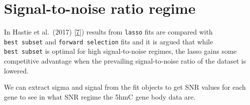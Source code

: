 \documentclass[
]{book}
\newenvironment{Shaded}{\begin{snugshade}}{\end{snugshade}}
\newcommand{\DecValTok}[1]{\textcolor[rgb]{0.00,0.00,0.81}{#1}}
\newcommand{\FloatTok}[1]{\textcolor[rgb]{0.00,0.00,0.81}{#1}}
\newcommand{\KeywordTok}[1]{\textcolor[rgb]{0.13,0.29,0.53}{\textbf{#1}}}
\newcommand{\NormalTok}[1]{#1}
\newcommand{\OperatorTok}[1]{\textcolor[rgb]{0.81,0.36,0.00}{\textbf{#1}}}
\newcommand{\StringTok}[1]{\textcolor[rgb]{0.31,0.60,0.02}{#1}}
\begin{document}
\hypertarget{snr-regime}{%
\section{Signal-to-noise ratio regime}\label{snr-regime}}

In Hastie et al.~(2017) {[}\protect\hyperlink{ref-Hastie:2017aa}{7}{]}) results from \texttt{lasso} fits are
compared with \texttt{best\ subset} and \texttt{forward\ selection} fits and it is argued
that while \texttt{best\ subset} is optimal for high signal-to-noise regimes,
the lasso gains some competitive advantage when the prevailing signal-to-noise
ratio of the dataset is lowered.

We can extract sigma and signal from the fit objects to get SNR values for each gene
to see in what SNR regime the 5hmC gene body data are.

\begin{Shaded}
\end{Shaded}
\end{document}
